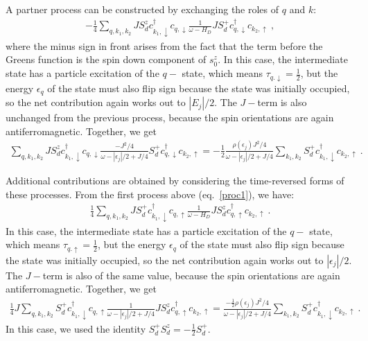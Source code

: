 A partner process can be constructed by exchanging the roles of \(q\) and \(k\):
\begin{equation}\begin{aligned}\label{proc2}
	-\frac{1}{4}\sum_{q, k_1, k_2} J S_d^z c^\dagger_{k_1, \downarrow} c_{q, \downarrow} \frac{1}{\omega - H_D} J S_d^+ c^\dagger_{q,\downarrow} c_{k_2, \uparrow}~,
\end{aligned}\end{equation}
where the minus sign in front arises from the fact that the term before the Greens function is the spin down component of \(s_0^z\). In this case, the intermediate state has a particle excitation of the \(q-\) state, which means \(\tau_{q.\downarrow} = \frac{1}{2}\), but the energy \(\epsilon_q\) of the state must also flip sign because the state was initially occupied, so the net contribution again works out to \(|E_j|/2\). The \(J-\)term is also unchanged from the previous process, because the spin orientations are again antiferromagnetic. Together, we get
\begin{equation}\begin{aligned}
	\sum_{q, k_1, k_2}J S_d^z c^\dagger_{k_1, \downarrow} c_{q, \downarrow} \frac{-J^2/4}{\omega - |\epsilon_j|/2 + J/4} S_d^+ c^\dagger_{q,\downarrow} c_{k_2, \uparrow} = -\frac{1}{2}\frac{\rho(\epsilon_j)J^2 / 4}{\omega - |\epsilon_j|/2 + J/4} \sum_{k_1, k_2}S_d^+ c^\dagger_{k_1, \downarrow} c_{k_2, \uparrow}~.
\end{aligned}\end{equation}

Additional contributions are obtained by considering the time-reversed forms of these processes. From the first process above (eq.~\ref{proc1}), we have:
\begin{equation}\begin{aligned}
	\frac{1}{4}\sum_{q, k_1, k_2}J S_d^+ c^\dagger_{k_1,\downarrow} c_{q, \uparrow} \frac{1}{\omega - H_D} J S_d^z c^\dagger_{q, \uparrow} c_{k_2, \uparrow}~.
\end{aligned}\end{equation}
In this case, the intermediate state has a particle excitation of the \(q-\) state, which means \(\tau_{q.\uparrow} = \frac{1}{2}\), but the energy \(\epsilon_q\) of the state must also flip sign because the state was initially occupied, so the net contribution again works out to \(|\epsilon_j|/2\). The \(J-\)term is also of the same value, because the spin orientations are again antiferromagnetic. Together, we get
\begin{equation}\begin{aligned}
	\frac{1}{4}J \sum_{q, k_1, k_2}S_d^+ c^\dagger_{k_1,\downarrow} c_{q, \uparrow} \frac{1}{\omega - |\epsilon_j|/2 + J/4} J S_d^z c^\dagger_{q, \uparrow} c_{k_2, \uparrow} = \frac{-\frac{1}{2} \rho(\epsilon_j)J^2 / 4}{\omega - |\epsilon_j|/2 + J/4} \sum_{k_1, k_2}S_d^+ c^\dagger_{k_1, \downarrow} c_{k_2, \uparrow}~.
\end{aligned}\end{equation}
In this case, we used the identity \(S_d^+ S_d^z = -\frac{1}{2}S_d^+\). 


